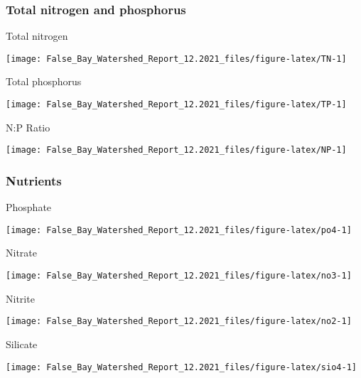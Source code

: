 \documentclass[
]{article}
\begin{document}
\hypertarget{total-nitrogen-and-phosphorus}{%
\subsubsection{Total nitrogen and
phosphorus}\label{total-nitrogen-and-phosphorus}}

Total nitrogen

\begin{center}\texttt{[image: False\_Bay\_Watershed\_Report\_12.2021\_files/figure-latex/TN-1]} \end{center}

\newpage

Total phosphorus

\begin{center}\texttt{[image: False\_Bay\_Watershed\_Report\_12.2021\_files/figure-latex/TP-1]} \end{center}

\newpage

N:P Ratio

\begin{center}\texttt{[image: False\_Bay\_Watershed\_Report\_12.2021\_files/figure-latex/NP-1]} \end{center}

\newpage

\hypertarget{nutrients}{%
\subsubsection{Nutrients}\label{nutrients}}

Phosphate

\begin{center}\texttt{[image: False\_Bay\_Watershed\_Report\_12.2021\_files/figure-latex/po4-1]} \end{center}

Nitrate

\begin{center}\texttt{[image: False\_Bay\_Watershed\_Report\_12.2021\_files/figure-latex/no3-1]} \end{center}

Nitrite

\begin{center}\texttt{[image: False\_Bay\_Watershed\_Report\_12.2021\_files/figure-latex/no2-1]} \end{center}

Silicate

\begin{center}\texttt{[image: False\_Bay\_Watershed\_Report\_12.2021\_files/figure-latex/sio4-1]} \end{center}
\end{document}
